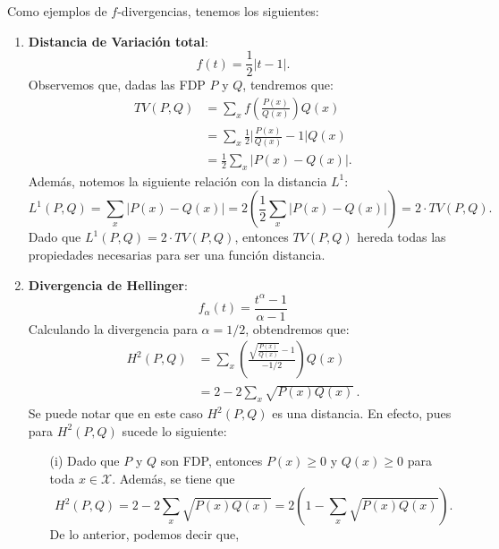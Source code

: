 \begin{example}\cite{1571417125811646464}
Como ejemplos de $f$-divergencias, tenemos los siguientes:
\begin{enumerate}[label=(\alph*)]
    \item \textbf{Distancia de Variaci\'on total}:
    \begin{equation*}
        f(t)=\frac{1}{2}|t-1|.
    \end{equation*}
    Observemos que, dadas las FDP $P$ y $Q$, tendremos que:
    \begin{align}
    TV(P,Q)&=\sum_{x}f\left(\frac{P(x)}{Q(x)}\right)Q(x)\nonumber\\
    &=\sum_{x}\frac{1}{2}\bigg|\frac{P(x)}{Q(x)}-1\bigg| Q(x)\nonumber\\
    &=\frac{1}{2}\sum_{x}|P(x)-Q(x)|.\label{eq:TV}
    \end{align}
    Adem\'as, notemos la siguiente relaci\'on con la distancia $L^1$: 
    \begin{equation*}
        L^1(P,Q)=\sum_{x}|P(x)-Q(x)|=2\left(\frac{1}{2}\sum_{x}|P(x)-Q(x)|\right)=2\cdot TV(P,Q).
    \end{equation*}
    Dado que $L^1(P,Q)=2\cdot TV(P,Q)$, entonces $TV(P,Q)$ hereda todas las propiedades necesarias para ser una funci\'on distancia. 
    \item \textbf{Divergencia de Hellinger}: 
    \begin{equation*}
        f_\alpha(t)=\frac{t^\alpha-1}{\alpha-1}
    \end{equation*}
    Calculando la divergencia para $\alpha=1/2$, obtendremos que:
    \begin{align}
        H^2(P,Q)&=\sum_x\left(\frac{\sqrt{\frac{P(x)}{Q(x)}}-1}{-1/2}\right)Q(x)\nonumber\\
        &=2-2\sum_x\sqrt{P(x)Q(x)}\,.\label{eq:Hellinger}
    \end{align}
    Se puede notar que en este caso $H^2(P,Q)$ es una distancia. En efecto, pues para $H ^2(P,Q)$ sucede lo siguiente:
    \begin{enumerate}
        \item[(i)] Dado que $P$ y $Q$ son FDP, entonces $P(x)\geq0$ y $Q(x)\geq0$ para toda $x\in\mathcal{X}$. Adem\'as, se tiene que 
        \begin{equation*}
            H^2(P,Q)=2-2\sum_{x}\sqrt{P(x)Q(x)}=2\left(1-\sum_{x}\sqrt{P(x)Q(x)}\right).
        \end{equation*}
        De lo anterior, podemos decir que, 
        \begin{equation*}

\end{equation*}
\end{enumerate}
\end{enumerate}
\end{example}
